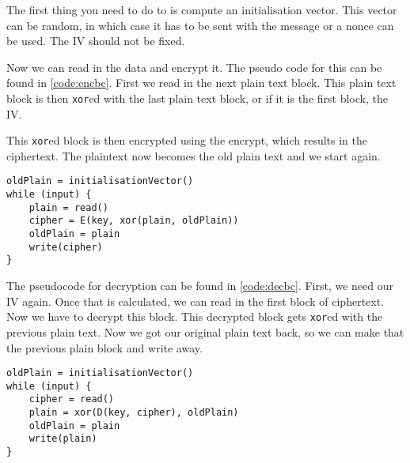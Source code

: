 The first thing you need to do to is compute an initialisation vector. This vector can be random, in which case it has to be sent with the message or a nonce can be used. The IV should not be fixed.

Now we can read in the data and encrypt it. The pseudo code for this can be found in \autoref{code:encbc}. First we read in the next plain text block. This plain text block is then \lstinline{xor}ed with the last plain text block, or if it is the first block, the IV. 

This \lstinline{xor}ed block is then encrypted using the encrypt, which results in the ciphertext. The plaintext now becomes the old plain text and we start again.

\begin{lstlisting}[caption={Encryption with CBC}, label=code:encbc]
oldPlain = initialisationVector()
while (input) {
	plain = read()
	cipher = E(key, xor(plain, oldPlain))
	oldPlain = plain
	write(cipher)
}
\end{lstlisting}

The pseudocode for decryption can be found in \autoref{code:decbc}. First, we need our IV again. Once that is calculated, we can read in the first block of ciphertext. Now we have to decrypt this block. This decrypted block gets \lstinline{xor}ed with the previous plain text. Now we got our original plain text back, so we can make that the previous plain block and write away. 

\begin{lstlisting}[caption={Decryption with CBC}, label=code:decbc]
oldPlain = initialisationVector()
while (input) {
	cipher = read()
	plain = xor(D(key, cipher), oldPlain)
	oldPlain = plain
	write(plain)
}
\end{lstlisting}